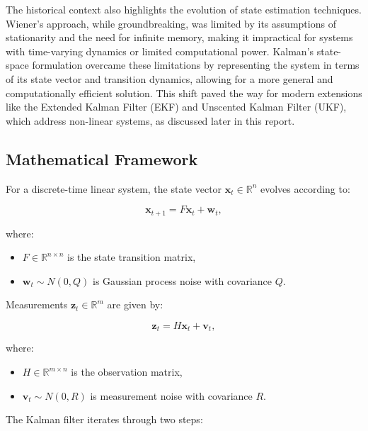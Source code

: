 \documentclass[12pt]{article}
\begin{document}
The historical context also highlights the evolution of state estimation techniques. Wiener’s approach, while groundbreaking, was limited by its assumptions of stationarity and the need for infinite memory, making it impractical for systems with time-varying dynamics or limited computational power. Kalman’s state-space formulation overcame these limitations by representing the system in terms of its state vector and transition dynamics, allowing for a more general and computationally efficient solution. This shift paved the way for modern extensions like the Extended Kalman Filter (EKF) and Unscented Kalman Filter (UKF), which address non-linear systems, as discussed later in this report.

\subsection{Mathematical Framework}
\label{subsec:math_framework}

For a discrete-time linear system, the state vector \( \mathbf{x}_t \in \mathbb{R}^n \) evolves according to:

\begin{equation}
    \mathbf{x}_{t+1} = F \mathbf{x}_t + \mathbf{w}_t,
    \label{eq:state_transition}
\end{equation}

where:
\begin{itemize}
    \item \( F \in \mathbb{R}^{n \times n} \) is the state transition matrix,
    \item \( \mathbf{w}_t \sim N(0, Q) \) is Gaussian process noise with covariance \( Q \).
\end{itemize}

Measurements \( \mathbf{z}_t \in \mathbb{R}^m \) are given by:

\begin{equation}
    \mathbf{z}_t = H \mathbf{x}_t + \mathbf{v}_t,
    \label{eq:measurement}
\end{equation}

where:
\begin{itemize}
    \item \( H \in \mathbb{R}^{m \times n} \) is the observation matrix,
    \item \( \mathbf{v}_t \sim N(0, R) \) is measurement noise with covariance \( R \).
\end{itemize}

The Kalman filter iterates through two steps:
\end{document}
